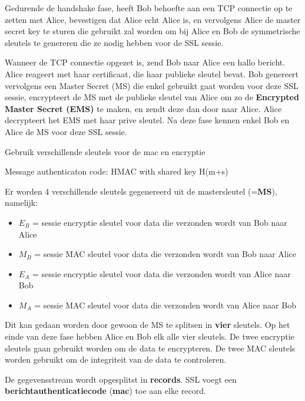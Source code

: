 \noindent Gedurende de handshake fase, heeft Bob behoefte aan een TCP connectie op te zetten met Alice, bevestigen dat Alice echt Alice is, en vervolgens Alice de master secret key te sturen die gebruikt zal worden om bij Alice en Bob de symmetrische sleutels te genereren die ze nodig hebben voor de SSL sessie.

\noindent Wanneer de TCP connectie opgezet is, zend Bob naar Alice een hallo bericht. Alice reageert met haar certificaat, die haar publieke sleutel bevat. Bob genereert vervolgens een Master Secret (MS) die enkel gebruikt gaat worden voor deze SSL sessie, encrypteert de MS met de publieke sleutel van Alice om zo de \textbf{Encrypted Master Secret (EMS)} te maken, en zendt deze dan door naar Alice. Alice decrypteert het EMS met haar prive sleutel. Na deze fase kennen enkel Bob en Alice de MS voor deze SSL sessie.

\newpage


\noindent Gebruik verschillende sleutels voor de \acrfull{mac} en encryptie

\noindent Message authenticaton code: HMAC with shared key H(m+s)

\noindent Er worden 4 verschillende sleutels gegenereerd uit de mastersleutel (=\textbf{MS}), namelijk:
\begin{itemize}
\item $E_B$ = sessie encryptie sleutel voor data die verzonden wordt van Bob naar Alice
\item $M_B$ = sessie MAC sleutel voor data die verzonden wordt van Bob naar Alice
\item $E_A$ = sessie encryptie sleutel voor data die verzonden wordt van Alice naar Bob
\item $M_A$ = sessie MAC sleutel voor data die verzonden wordt van Alice naar Bob
\end{itemize}

\noindent Dit kan gedaan worden door gewoon de MS te splitsen in \textbf{vier} sleutels. Op het einde van deze fase hebben Alice en Bob elk alle vier sleutels. De twee encryptie sleutels gaan gebruikt worden om de data te encrypteren. De twee MAC sleutels worden gebruikt om de integriteit van de data te controleren.



De gegevensstream wordt opgesplitst in \textbf{records}. SSL voegt een \textbf{berichtauthenticatiecode} (\textbf{\acrshort{mac}}) toe aan elke record.

